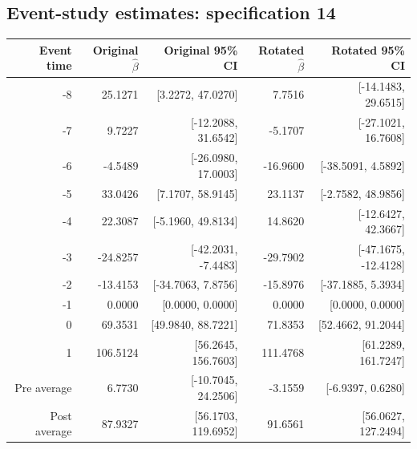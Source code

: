 \documentclass[10pt]{article}
\begin{document}
\subsection*{Event-study estimates: specification 14}
\begin{center}\scriptsize
\begin{tabular}{r rr rr}
\toprule
Event time & Original $\hat\beta$ & Original 95\% CI & Rotated $\hat\beta$ & Rotated 95\% CI \\
\midrule
-8 & 25.1271 & [3.2272, 47.0270] & 7.7516 & [-14.1483, 29.6515] \\
-7 & 9.7227 & [-12.2088, 31.6542] & -5.1707 & [-27.1021, 16.7608] \\
-6 & -4.5489 & [-26.0980, 17.0003] & -16.9600 & [-38.5091, 4.5892] \\
-5 & 33.0426 & [7.1707, 58.9145] & 23.1137 & [-2.7582, 48.9856] \\
-4 & 22.3087 & [-5.1960, 49.8134] & 14.8620 & [-12.6427, 42.3667] \\
-3 & -24.8257 & [-42.2031, -7.4483] & -29.7902 & [-47.1675, -12.4128] \\
-2 & -13.4153 & [-34.7063, 7.8756] & -15.8976 & [-37.1885, 5.3934] \\
-1 & 0.0000 & [0.0000, 0.0000] & 0.0000 & [0.0000, 0.0000] \\
0 & 69.3531 & [49.9840, 88.7221] & 71.8353 & [52.4662, 91.2044] \\
1 & 106.5124 & [56.2645, 156.7603] & 111.4768 & [61.2289, 161.7247] \\
\midrule
Pre average & 6.7730 & [-10.7045, 24.2506] & -3.1559 & [-6.9397, 0.6280] \\
Post average & 87.9327 & [56.1703, 119.6952] & 91.6561 & [56.0627, 127.2494] \\
\bottomrule
\end{tabular}
\end{center}
\clearpage
\end{document}
